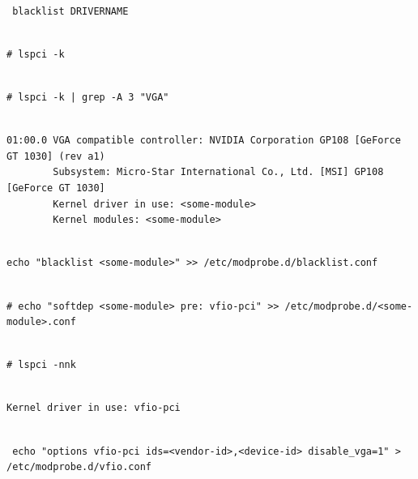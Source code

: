 \begin{lstlisting}

 blacklist DRIVERNAME

\end{lstlisting}

\begin{lstlisting}

# lspci -k

\end{lstlisting}

\begin{lstlisting}

# lspci -k | grep -A 3 "VGA"

\end{lstlisting}

\begin{lstlisting}

01:00.0 VGA compatible controller: NVIDIA Corporation GP108 [GeForce GT 1030] (rev a1)
        Subsystem: Micro-Star International Co., Ltd. [MSI] GP108 [GeForce GT 1030]
        Kernel driver in use: <some-module>
        Kernel modules: <some-module>

\end{lstlisting}

\begin{lstlisting}

echo "blacklist <some-module>" >> /etc/modprobe.d/blacklist.conf

\end{lstlisting}

\begin{lstlisting}

# echo "softdep <some-module> pre: vfio-pci" >> /etc/modprobe.d/<some-module>.conf

\end{lstlisting}

\begin{lstlisting}

# lspci -nnk

\end{lstlisting}

\begin{lstlisting}

Kernel driver in use: vfio-pci

\end{lstlisting}

\begin{lstlisting}

 echo "options vfio-pci ids=<vendor-id>,<device-id> disable_vga=1" > /etc/modprobe.d/vfio.conf

\end{lstlisting}

